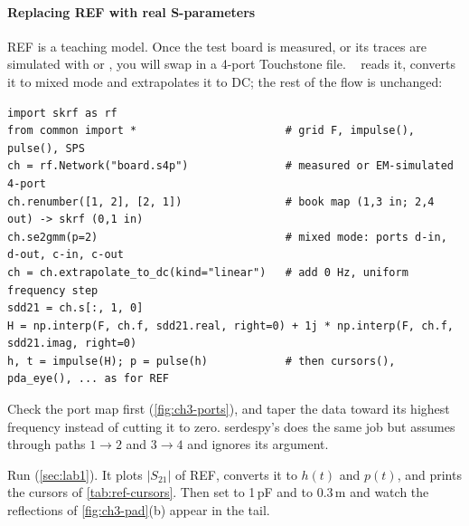 \paragraph{Replacing REF with real S-parameters}
REF is a teaching model. Once the \OS{} test board is measured, or its traces are simulated with  or , you will swap in a 4-port Touchstone file. ~\citep{p2:skrf2022} reads it, converts it to mixed mode and extrapolates it to DC; the rest of the flow is unchanged:
\begin{lstlisting}
import skrf as rf
from common import *                       # grid F, impulse(), pulse(), SPS
ch = rf.Network("board.s4p")               # measured or EM-simulated 4-port
ch.renumber([1, 2], [2, 1])                # book map (1,3 in; 2,4 out) -> skrf (0,1 in)
ch.se2gmm(p=2)                             # mixed mode: ports d-in, d-out, c-in, c-out
ch = ch.extrapolate_to_dc(kind="linear")   # add 0 Hz, uniform frequency step
sdd21 = ch.s[:, 1, 0]
H = np.interp(F, ch.f, sdd21.real, right=0) + 1j * np.interp(F, ch.f, sdd21.imag, right=0)
h, t = impulse(H); p = pulse(h)            # then cursors(), pda_eye(), ... as for REF
\end{lstlisting}
Check the port map first (\cref{fig:ch3-ports}), and taper the data toward its highest frequency instead of cutting it to zero. serdespy's  does the same job but assumes through paths $1\to2$ and $3\to4$ and ignores its  argument.

\begin{tryit}
Run  (\cref{sec:lab1}). It plots $\lvert S_{21}\rvert$ of REF, converts it to $h(t)$ and $p(t)$, and prints the cursors of \cref{tab:ref-cursors}. Then set  to 1\,pF and  to 0.3\,m and watch the reflections of \cref{fig:ch3-pad}(b) appear in the tail.
\end{tryit}

